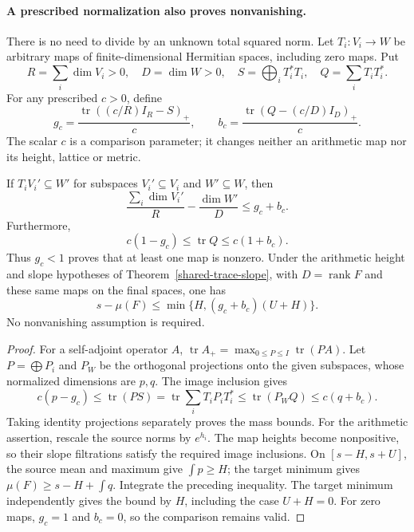 \paragraph{A prescribed normalization also proves nonvanishing.}
There is no need to divide by an unknown total squared norm. Let
\(T_i:V_i\to W\) be arbitrary maps of finite-dimensional Hermitian
spaces, including zero maps. Put
\[
 R=\sum_i\dim V_i>0,\quad D=\dim W>0,\quad
 S=\bigoplus_iT_i^*T_i,\quad Q=\sum_iT_iT_i^*.
\]
For any prescribed \(c>0\), define
\[
 g_c=\frac{\operatorname{tr}((c/R)I_R-S)_+}{c},\qquad
 b_c=\frac{\operatorname{tr}(Q-(c/D)I_D)_+}{c}.
\]
The scalar \(c\) is a comparison parameter; it changes neither an
arithmetic map nor its height, lattice or metric.

\begin{theorem}
\label{shared-prescribed-trace}
If \(T_iV_i'\subseteq W'\) for subspaces \(V_i'\subseteq V_i\) and
\(W'\subseteq W\), then
\[
 \frac{\sum_i\dim V_i'}R-\frac{\dim W'}D\le g_c+b_c.
\]
Furthermore,
\[
 c(1-g_c)\le\operatorname{tr}Q\le c(1+b_c).
\]
Thus \(g_c<1\) proves that at least one map is nonzero.
Under the arithmetic height and slope hypotheses of
Theorem~\ref{shared-trace-slope}, with \(D=\operatorname{rank}F\)
and these same maps on the final spaces, one has
\begin{equation}\label{shared-prescribed-slope}
 s-\mu(F)\le\min\{H,(g_c+b_c)(U+H)\}.
\end{equation}
No nonvanishing assumption is required.
\end{theorem}

\begin{proof}
For a self-adjoint operator \(A\),
\(\operatorname{tr}A_+=\max_{0\le P\le I}\operatorname{tr}(PA)\).
Let \(P=\bigoplus P_i\) and \(P_W\) be the orthogonal projections
onto the given subspaces, whose normalized dimensions are \(p,q\).
The image inclusion gives
\[
 c(p-g_c)\le\operatorname{tr}(PS)
 =\operatorname{tr}\sum_iT_iP_iT_i^*
 \le\operatorname{tr}(P_WQ)\le c(q+b_c).
\]
Taking identity projections separately proves the mass bounds.
For the arithmetic assertion, rescale the source norms by \(e^{h_i}\).
The map heights become nonpositive, so their slope filtrations satisfy
the required image inclusions. On \([s-H,s+U]\), the source mean and
maximum give \(\int p\ge H\); the target minimum gives
\(\mu(F)\ge s-H+\int q\). Integrate the preceding inequality.
The target minimum independently gives the bound by \(H\), including
the case \(U+H=0\). For zero maps, \(g_c=1\) and \(b_c=0\), so
the comparison remains valid.
\end{proof}

